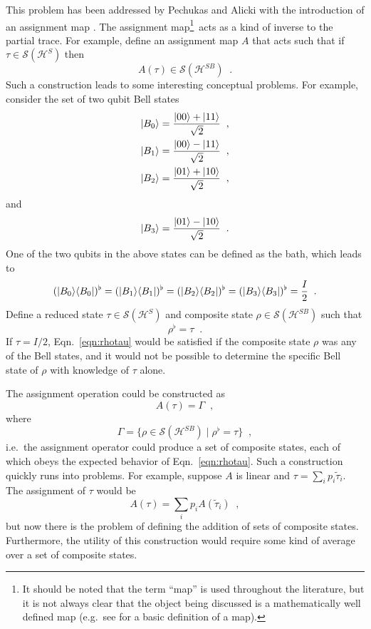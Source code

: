 This problem has been addressed by Pechukas and Alicki with the introduction of an assignment map \cite{Pechukas1994}\cite{Alicki1995}\cite{Pechukas1995}.  The assignment map\footnote{It should be noted that the term ``map'' is used throughout the literature, but it is not always clear that the object being discussed is a mathematically well defined map (e.g.\ see \cite{Fraleigh2003} for a basic definition of a map).}\ acts as a kind of inverse to the partial trace.  For example, define an assignment map $A$ that acts such that if $\tau\in\mathcal{S}(\mathcal{H}^S)$ then
$$
A(\tau)\in\mathcal{S}(\mathcal{H}^{SB})\;\;.
$$
Such a construction leads to some interesting conceptual problems.  For example, consider the set of two qubit Bell states
\begin{eqnarray*}
\left|B_0\right\rangle = \frac{\left|00\right\rangle+\left|11\right\rangle}{\sqrt{2}}\;\;,\\
\left|B_1\right\rangle = \frac{\left|00\right\rangle-\left|11\right\rangle}{\sqrt{2}}\;\;,\\
\left|B_2\right\rangle = \frac{\left|01\right\rangle+\left|10\right\rangle}{\sqrt{2}}\;\;,
\end{eqnarray*}
and
$$
\left|B_3\right\rangle = \frac{\left|01\right\rangle-\left|10\right\rangle}{\sqrt{2}}\;\;.
$$
One of the two qubits in the above states can be defined as the bath, which leads to
$$
(|B_0\rangle\langle B_0|)^\flat = (|B_1\rangle\langle B_1|)^\flat = (|B_2\rangle\langle B_2|)^\flat = (|B_3\rangle\langle B_3|)^\flat = \frac{I}{2}\;\;.
$$
Define a reduced state $\tau\in\mathcal{S}(\mathcal{H}^{S})$ and composite state $\rho\in\mathcal{S}(\mathcal{H}^{SB})$ such that 
\begin{equation}
\label{eqn:rhotau}
\rho^\flat = \tau\;\;.
\end{equation} 
If $\tau = I/2$, Eqn.\ \ref{eqn:rhotau} would be satisfied if the composite state $\rho$ was any of the Bell states, and it would not be possible to determine the specific Bell state of $\rho$ with knowledge of $\tau$ alone.  

The assignment operation could be constructed as
$$
A(\tau) = \Gamma\;\;,
$$
where
$$
\Gamma = \{\rho\in\mathcal{S}(\mathcal{H}^{SB})\;|\;\rho^\flat = \tau\}\;\;,
$$
i.e.\ the assignment operator could produce a set of composite states, each of which obeys the expected behavior of Eqn.\ \ref{eqn:rhotau}.  Such a construction quickly runs into problems.  For example, suppose $A$ is linear and $\tau=\sum_i p_i \tilde{\tau}_i$.  The assignment of $\tau$ would be
$$
A(\tau) = \sum_i p_i A(\tilde{\tau}_i)\;\;,
$$
but now there is the problem of defining the addition of sets of composite states.  Furthermore, the utility of this construction would require some kind of average over a set of composite states.  


